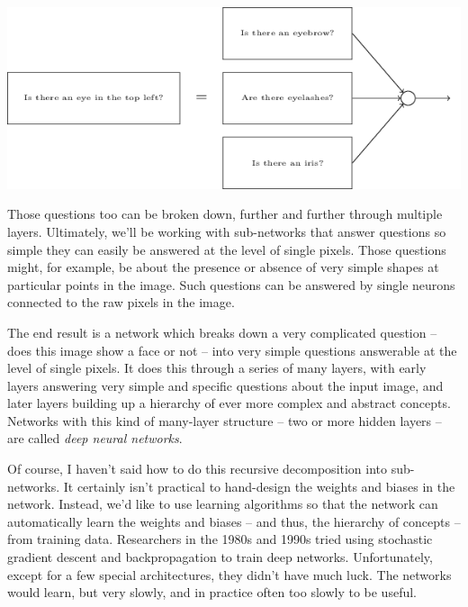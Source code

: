 \documentclass[a4paper,twoside,10pt]{book}
\begin{document}
\begin{center}
	\includegraphics[scale=0.5]{./figures/ch1/tikz15}
\end{center}
Those questions too can be broken down, further and further through multiple layers. Ultimately, we'll be working with sub-networks that answer questions so simple they can easily be answered at the level of single pixels. Those questions might, for example, be about the presence or absence of very simple shapes at particular points in the image. Such questions can be answered by single neurons connected to the raw pixels in the image.

The end result is a network which breaks down a very complicated question -- does this image show a face or not -- into very simple questions answerable at the level of single pixels. It does this through a series of many layers, with early layers answering very simple and specific questions about the input image, and later layers building up a hierarchy of ever more complex and abstract concepts. Networks with this kind of many-layer structure -- two or more hidden layers -- are called \textit{deep neural networks}.

Of course, I haven't said how to do this recursive decomposition into sub-networks. It certainly isn't practical to hand-design the weights and biases in the network. Instead, we'd like to use learning algorithms so that the network can automatically learn the weights and biases -- and thus, the hierarchy of concepts -- from training data. Researchers in the 1980s and 1990s tried using stochastic gradient descent and backpropagation to train deep networks. Unfortunately, except for a few special architectures, they didn't have much luck. The networks would learn, but very slowly, and in practice often too slowly to be useful.
\end{document}
